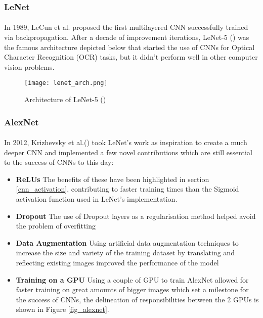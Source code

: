 \subsubsection{LeNet}
\paragraph{}
In 1989, LeCun et al. proposed the first multilayered \gls{CNN} successfully trained via backpropagation. After a decade of improvement iterations, LeNet-5 (\cite{726791}) was the famous architecture depicted below that started the use of \gls{CNN}s for Optical Character Recognition (OCR) tasks, but it didn't perform well in other computer vision problems.

    \begin{figure}[hbt!]
        \centering
        \texttt{[image: lenet\_arch.png]}
        \caption{Architecture of LeNet-5 (\cite{726791})}
        \label{fig_lenet}
    \end{figure}
    
\subsubsection{AlexNet}
\paragraph{}
In 2012, Krizhevsky et al.(\cite{10.5555/2999134.2999257}) took LeNet's work as inspiration to create a much deeper \gls{CNN} and implemented a few novel contributions which are still essential to the success of \gls{CNN}s to this day:
\begin{itemize}
    \item \textbf{\gls{ReLU}s} The benefits of these have been highlighted in section \ref{cnn_activation}, contributing to faster training times than the Sigmoid activation function used in LeNet's implementation.
    \item \textbf{Dropout} The use of Dropout layers as a regularisation method helped avoid the problem of overfitting
    \item \textbf{Data Augmentation} Using artificial data augmentation techniques to increase the size and variety of the training dataset by translating and reflecting existing images improved the performance of the model
     \item \textbf{Training on a \gls{GPU}} Using a couple of \gls{GPU} to train AlexNet allowed for faster training on great amounts of bigger images which set a milestone for the success of \gls{CNN}s, the delineation of responsibilities between the 2 \gls{GPU}s is shown in Figure \ref{fig_alexnet}.
\end{itemize}

